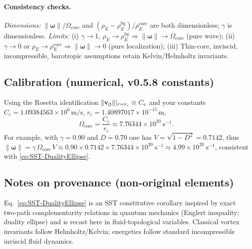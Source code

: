 \documentclass[10pt,reprint,aps,onecolumn,nofootinbib]{revtex4-2}
\newcommand{\vnorm}{\lVert \mathbf{v}_{\mkern-2mu\scriptscriptstyle\boldsymbol{\circlearrowleft}} \rVert}               %
\newcommand{\rhoE}{\rho_{\!E}}                           %
\newcommand{\rc}{r_c}                                    %
\providecommand{\rc}{r_c}
\newcommand{\omegaVec}{\boldsymbol{\omega}}
\newcommand{\OmegaCore}{\Omega_{\mathrm{core}}}
\newcommand{\bg}{\mathrm{bg}}
\newcommand{\core}{\mathrm{core}}
\begin{document}
    \paragraph{Consistency checks.}
        \emph{Dimensions:} $\lVert\omegaVec\rVert/\OmegaCore$ and $(\rhoE-\rhoE^{\bg})/\rhoE^{\core}$ are both dimensionless; $\gamma$ is dimensionless.
        \emph{Limits:}
        (i) $\gamma\to1$, $\rhoE\to\rhoE^{\bg}\Rightarrow \lVert\omegaVec\rVert\to\OmegaCore$ (pure wave);
        (ii) $\gamma\to0$ or $\rhoE\!\to\!\rhoE^{\core}\Rightarrow \lVert\omegaVec\rVert\to0$ (pure localization);
        (iii) Thin-core, inviscid, incompressible, barotropic assumptions retain Kelvin/Helmholtz invariants.

    \subsection{Calibration (numerical, v0.5.8 constants)}
    \label{subsec:Calibration-DE}

    Using the Rosetta identification $\vnorm|_{r=\rc}\equiv C_e$ and your constants
    $C_e=1.09384563\times10^{6}\,\mathrm{m/s}$, $\rc=1.40897017\times10^{-15}\,\mathrm{m}$,
    \begin{equation}
    \OmegaCore=\frac{C_e}{\rc} \approx 7.76344\times10^{20}\ \mathrm{s}^{-1}.
    \end{equation}
    For example, with $\gamma=0.90$ and $D=0.70$ one has
    $V=\sqrt{1-D^{2}}=0.7142$, thus $\lVert\omegaVec\rVert=\gamma\,\OmegaCore\,V\approx
    0.90\times 0.7142\times 7.76344\times10^{20}\ \mathrm{s}^{-1}\approx 4.99\times10^{20}\ \mathrm{s}^{-1}$,
    consistent with \eqref{eq:SST-DualityEllipse}.

    \subsection*{Notes on provenance (non-original elements)}
    Eq.~\eqref{eq:SST-DualityEllipse} is an SST constitutive corollary inspired by exact
    two-path complementarity relations in quantum mechanics (Englert inequality; duality ellipse)
    and is recast here in fluid-topological variables. Classical vortex invariants follow
    Helmholtz/Kelvin; energetics follow standard incompressible inviscid fluid dynamics.


\end{document}
